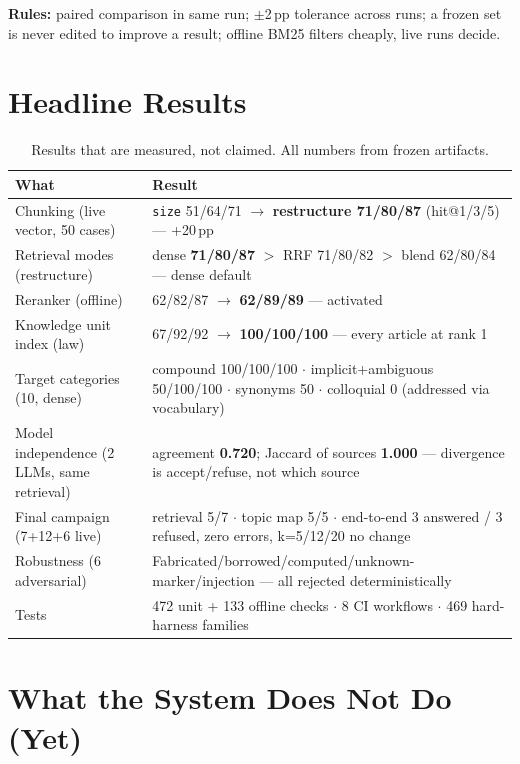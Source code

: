 \documentclass[a4paper,12pt]{report}
\begin{document}
\noindent\textbf{Rules:} paired comparison in same run; $\pm$2\,pp tolerance across runs; a frozen set is never edited to improve a result; offline BM25 filters cheaply, live runs decide.

\section{Headline Results}

\begin{table}[H]
\centering\footnotesize
\begin{tabular}{p{5.6cm}p{8.6cm}}
\toprule
\textbf{What} & \textbf{Result} \\
\midrule
Chunking (live vector, 50 cases) & \texttt{size} 51/64/71 $\rightarrow$ \textbf{restructure 71/80/87} (hit@1/3/5) --- +20\,pp \\
Retrieval modes (restructure) & dense \textbf{71/80/87} $>$ RRF 71/80/82 $>$ blend 62/80/84 --- dense default \\
Reranker (offline) & 62/82/87 $\rightarrow$ \textbf{62/89/89} --- activated \\
Knowledge unit index (law) & 67/92/92 $\rightarrow$ \textbf{100/100/100} --- every article at rank 1 \\
Target categories (10, dense) & compound 100/100/100 $\cdot$ implicit+ambiguous 50/100/100 $\cdot$ synonyms 50 $\cdot$ colloquial 0 (addressed via vocabulary) \\
Model independence (2 LLMs, same retrieval) & agreement \textbf{0.720}; Jaccard of sources \textbf{1.000} --- divergence is accept/refuse, not which source \\
Final campaign (7+12+6 live) & retrieval 5/7 $\cdot$ topic map 5/5 $\cdot$ end-to-end 3 answered / 3 refused, zero errors, k=5/12/20 no change \\
Robustness (6 adversarial) & Fabricated/borrowed/computed/unknown-marker/injection --- all rejected deterministically \\
Tests & 472 unit + 133 offline checks $\cdot$ 8 CI workflows $\cdot$ 469 hard-harness families \\
\bottomrule
\end{tabular}
\caption{Results that are measured, not claimed. All numbers from frozen artifacts.}
\end{table}

\section{What the System Does Not Do (Yet)}
\end{document}
